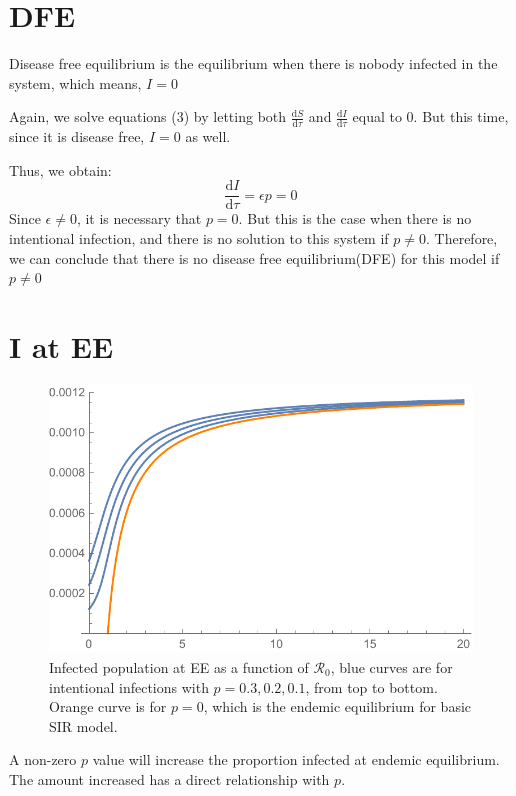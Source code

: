 \documentclass[12pt]{article}
\newcommand\dbyd[2]{\frac{\mathrm d{#1}}{\mathrm d{#2}}}
\newcommand{\R}{\mathcal{R}}
\begin{document}
\section{DFE}

Disease free equilibrium is the equilibrium when there is nobody infected in the system, which means, $I=0$

Again, we solve equations (3) by letting both $\dbyd{S}{\tau}$ and $\dbyd{I}{\tau}$ equal to 0. But this time, since it is disease free, $I=0$ as well.

Thus, we obtain:
\begin{equation}
\dbyd{I}{\tau}=\epsilon p=0
\end{equation}
Since $\epsilon\neq0$, it is necessary that $p=0$. But this is the case when there is no intentional infection, and there is no solution to this system if $p\neq0$. Therefore, we can conclude that there is no disease free equilibrium(DFE) for this model if $p\neq0$

\section{I at EE}

\begin{figure}[H]
  \caption{Infected population at EE as a function of $\R_0$, blue curves are for intentional infections with $p=0.3,0.2,0.1$, from top to bottom. Orange curve is for $p=0$, which is the endemic equilibrium for basic SIR model.}
  \centering
  \includegraphics[width=1.1\textwidth]{Figures/I_at_E_E_SIR_vs_Int.pdf}
\end{figure}

A non-zero $p$ value will increase the proportion infected at endemic equilibrium. The amount increased has a direct relationship with $p$. 
\end{document}

